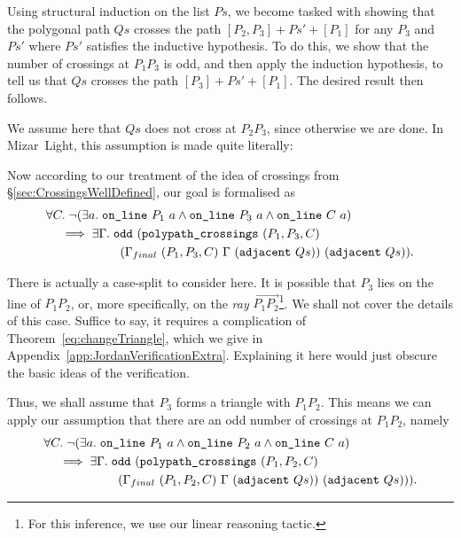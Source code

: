 Using structural induction on the list $Ps$, we become tasked with showing that the polygonal path $Qs$ crosses the path $[P_2,P_3] + Ps' + [P_1]$ for any $P_3$ and $Ps'$ where $Ps'$ satisfies the inductive hypothesis. To do this, we show that the number of crossings at $P_1P_3$ is odd, and then apply the induction hypothesis, to tell us that $Qs$ crosses the path $[P_3] + Ps' + [P_1]$. The desired result then follows.

We assume here that $Qs$ does not cross at $P_2P_3$, since otherwise we are done. In Mizar~Light, this assumption is made quite literally:

\begin{center}\end{center}

Now according to our treatment of the idea of crossings from \S\ref{sec:CrossingsWellDefined}, our goal is formalised as
\begin{equation*}
  \begin{aligned}
    &\forall C.\; \neg(\exists a.\; \texttt{on\_line}\ P_1\ a\wedge \texttt{on\_line}\ P_3\ a\wedge \texttt{on\_line}\ C\ a)\\
    &\quad \implies \exists \Gamma.\; \texttt{odd}\ (\texttt{polypath\_crossings}\ (P_1,P_3,C)\\
    &\qquad\qquad\qquad(\Gamma_{final}\ (P_1,P_3,C)\ \Gamma\ (\texttt{adjacent}\ Qs))\ (\texttt{adjacent}\ Qs)).
  \end{aligned}
\end{equation*}

There is actually a case-split to consider here. It is possible that $P_3$ lies on the line of $P_1P_2$, or, more specifically, on the \emph{ray} $\overrightarrow{P_1P_2}$\footnote{For this inference, we use our linear reasoning tactic.}. We shall not cover the details of this case. Suffice to say, it requires a complication of Theorem~\ref{eq:changeTriangle}, which we give in Appendix~\ref{app:JordanVerificationExtra}. Explaining it here would just obscure the basic ideas of the verification.

Thus, we shall assume that $P_3$ forms a triangle with $P_1P_2$. This means we can apply our assumption that there are an odd number of crossings at $P_1P_2$, namely
\begin{align*}&\forall C.\; \neg(\exists a.\; \texttt{on\_line}\ P_1\ a\wedge \texttt{on\_line}\ P_2\ a\wedge \texttt{on\_line}\ C\ a)\\
    &\quad\implies \exists \Gamma.\; \texttt{odd}\ (\texttt{polypath\_crossings}\ (P_1,P_2,C)\\
    &\qquad\qquad\qquad(\Gamma_{final}\ (P_1,P_2,C)\ \Gamma\ (\texttt{adjacent}\ Qs))\ (\texttt{adjacent}\ Qs))).
\end{align*}


